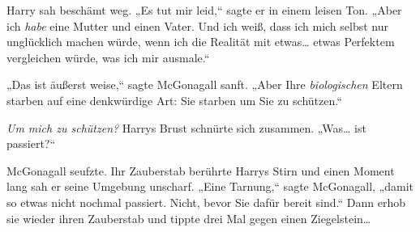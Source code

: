 Harry sah beschämt weg. „Es tut mir leid,“ sagte er in einem leisen Ton. „Aber ich \emph{habe} eine Mutter und einen Vater. Und ich weiß, dass ich mich selbst nur unglücklich machen würde, wenn ich die Realität mit etwas… etwas Perfektem vergleichen würde, was ich mir ausmale.“

„Das ist äußerst weise,“ sagte McGonagall sanft. „Aber Ihre \emph{biologischen} Eltern starben auf eine denkwürdige Art: Sie starben um Sie zu schützen.“

\emph{Um mich zu schützen?} Harrys Brust schnürte sich zusammen. „Was… ist passiert?“

McGonagall seufzte. Ihr Zauberstab berührte Harrys Stirn und einen Moment lang sah er seine Umgebung unscharf. „Eine Tarnung,“ sagte McGonagall, „damit so etwas nicht nochmal passiert. Nicht, bevor Sie dafür bereit sind.“ Dann erhob sie wieder ihren Zauberstab und tippte drei Mal gegen einen Ziegelstein…

